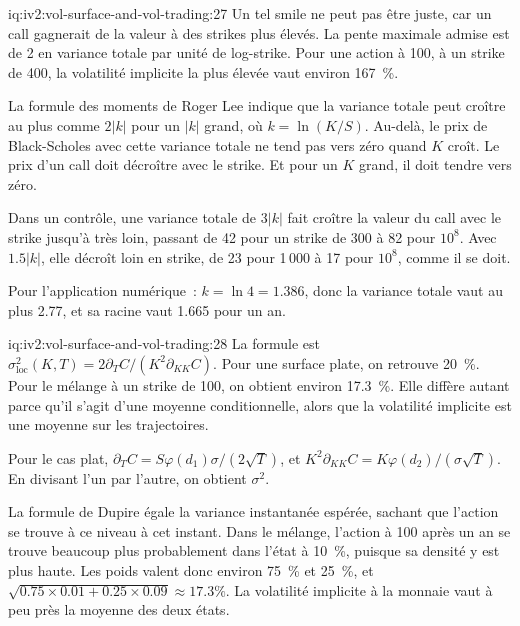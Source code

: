\begin{solution}{iq:iv2:vol-surface-and-vol-trading:27}
Un tel smile ne peut pas être juste, car un call gagnerait de la valeur à des strikes plus élevés. La pente maximale admise est de 2 en variance totale par unité de log-strike. Pour une action à 100, à un strike de 400, la volatilité implicite la plus élevée vaut environ 167~\%.

La formule des moments de Roger Lee indique que la variance totale peut croître au plus comme $2|k|$ pour un $|k|$ grand, où $k = \ln(K/S)$. Au-delà, le prix de Black-Scholes avec cette variance totale ne tend pas vers zéro quand $K$ croît. Le prix d'un call doit décroître avec le strike. Et pour un $K$ grand, il doit tendre vers zéro.

Dans un contrôle, une variance totale de $3|k|$ fait croître la valeur du call avec le strike jusqu'à très loin, passant de 42 pour un strike de 300 à 82 pour $10^8$. Avec $1.5|k|$, elle décroît loin en strike, de 23 pour 1\,000 à 17 pour $10^8$, comme il se doit.

Pour l'application numérique~: $k = \ln 4 = 1.386$, donc la variance totale vaut au plus 2.77, et sa racine vaut 1.665 pour un an.

\end{solution}

\begin{solution}{iq:iv2:vol-surface-and-vol-trading:28}
La formule est $\sigma_{\text{loc}}^2(K, T) = 2\partial_TC/(K^2\partial_{KK}C)$. Pour une surface plate, on retrouve 20~\%. Pour le mélange à un strike de 100, on obtient environ 17.3~\%. Elle diffère autant parce qu'il s'agit d'une moyenne conditionnelle, alors que la volatilité implicite est une moyenne sur les trajectoires.

Pour le cas plat, $\partial_TC = S\varphi(d_1)\sigma/(2\sqrt T)$, et $K^2\partial_{KK}C = K\varphi(d_2)/(\sigma\sqrt T)$. En divisant l'un par l'autre, on obtient $\sigma^2$.

La formule de Dupire égale la variance instantanée espérée, sachant que l'action se trouve à ce niveau à cet instant. Dans le mélange, l'action à 100 après un an se trouve beaucoup plus probablement dans l'état à 10~\%, puisque sa densité y est plus haute. Les poids valent donc environ 75~\% et 25~\%, et $\sqrt{0.75 \times 0.01 + 0.25 \times 0.09} \approx 17.3\%$. La volatilité implicite à la monnaie vaut à peu près la moyenne des deux états.

\end{solution}

